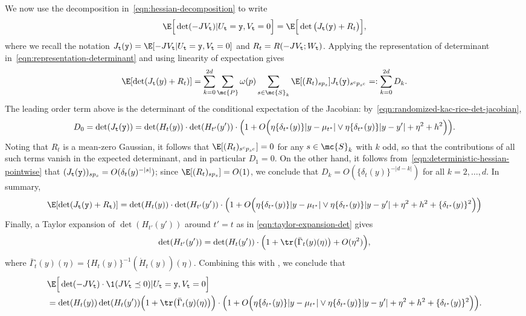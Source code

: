 \documentclass{article}
\begin{document}
	We now use the decomposition in~\eqref{eqn:hessian-decomposition} to write
	\begin{equation*}
		\E\Big[\det(-JV_{\tt t})|U_{{\tt t}} = {\tt y}, V_{{\tt t}} = 0\Big] = \E\Big[\det\big(J_{{\tt t}}({\tt y}) + R_t\big)\Big],
	\end{equation*}
	where we recall the notation $J_{{\tt t}}({\tt y}) = \E[-JV_{\tt t}|U_{{\tt t}} = {\tt y}, V_{{\tt t}} = 0]$ and $R_t = R(-JV_{\tt t};W_{{\tt t}})$. Applying the representation of determinant in~\eqref{eqn:representation-determinant} and using linearity of expectation gives
	\begin{align*}
		\E[\det(J_{\tt t}(y) + R_t)] = \sum_{k = 0}^{2d} \sum_{\mc{P}} \omega(p) \sum_{s \in \mc{S}_k} \E[(R_t)_{sp_{s}}] J_{{\tt t}}({\tt y})_{s^cp_{s^c}} =: \sum_{k = 0}^{2d} D_k.
	\end{align*}
	The leading order term above is the determinant of the conditional expectation of the Jacobian: by~\eqref{eqn:randomized-kac-rice-det-jacobian},
	$$
	D_0 = \det(J_{\tt t}({\tt y})) = \det(H_t(y)) \cdot \det(H_{t'}(y')) \cdot \Big(1 + O\Big(\eta\{\delta_{t^*}(y)\}|y - \mu_{t^*}| \vee \eta\{\delta_{t^*}(y)\}|y - y'| + \eta^2 + h^2\Big)\Big).
	$$ 
	Noting that $R_t$ is a mean-zero Gaussian, it follows that $\E[(R_t)_{s^cp_{s^c}}] = 0$ for any $s \in \mc{S}_k$ with $k$ odd, so that the contributions of all such terms vanish in the expected determinant, and in particular $D_1 = 0$. On the other hand, it follows from~\eqref{eqn:deterministic-hessian-pointwise} that
	$(J_{\tt t}({\tt y}))_{sp_s} = O(\delta_{t}(y)^{-|s|})$; since $\E[(R_t)_{sp_s}] = O(1)$, we conclude that $D_k = O(\{\delta_{t}(y)\}^{-|d - k|})$ for all $k = 2,\ldots,d$. In summary,
	\begin{equation*}
		\E[\det(J_{\tt t}({\tt y}) + R_{\tt t})] = \det(H_t(y)) \cdot \det(H_{t'}(y')) \cdot \Big(1 + O\Big(\eta\{\delta_{t^*}(y)\}|y - \mu_{t^*}| \vee \eta\{\delta_{t^*}(y)\}|y - y'| + \eta^2 + h^2 + \{\delta_{t^*}(y)\}^{2}\Big)\Big)
	\end{equation*}
	Finally, a Taylor expansion of $\det(H_{t'}(y'))$ around $t' = t$ as in \eqref{eqn:taylor-expansion-det} gives
	\begin{equation*}
		\det(H_{t'}(y')) = \det(H_t(y')) \cdot \Big(1 + \tr\big(\bar{\Gamma}_t(y)(\eta)\big) + O(\eta^2)\Big),
	\end{equation*}
	where $\bar{\Gamma}_t(y)(\eta) = \{H_t(y)\}^{-1}(\dot{H}_t(y))(\eta)$. Combining this with , we conclude that 
	\begin{equation*}
		\begin{aligned}
			& \E\Big[\det(-J V_{\tt t}) \cdot \1(JV_{\tt t} \preceq 0)|U_{\tt t} = {\tt y},V_{\tt t} = 0\Big] 
			\\
			& = \det(H_t(y)) \det(H_{t}(y')) \Big(1 + \tr\big(\bar{\Gamma}_t(y)(\eta)\big)\Big) \cdot \Big(1 + O\Big(\eta\{\delta_{t^*}(y)\}|y - \mu_{t^*}| \vee \eta\{\delta_{t^*}(y)\}|y - y'| + \eta^2 + h^2 + \{\delta_{t^*}(y)\}^2\Big)\Big).
		\end{aligned}
	\end{equation*}
	
\end{document}

